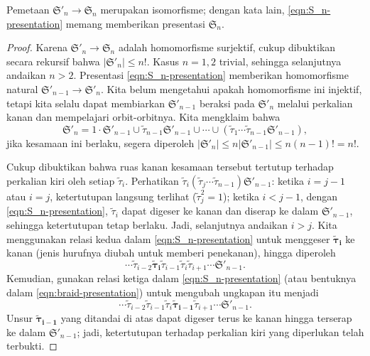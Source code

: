 \begin{theorem}\label{prop:S_n-presentation}
	Pemetaan $\mathfrak{S}'_n \to \mathfrak{S}_n$ merupakan isomorfisme; dengan kata lain, \eqref{eqn:S_n-presentation} memang memberikan presentasi $\mathfrak{S}_n$.
\end{theorem}
\begin{proof}
	Karena $\mathfrak{S}'_n \to \mathfrak{S}_n$ adalah homomorfisme surjektif, cukup dibuktikan secara rekursif bahwa $|\mathfrak{S}'_n| \leq n!$. Kasus $n=1,2$ trivial, sehingga selanjutnya andaikan $n > 2$. Presentasi \eqref{eqn:S_n-presentation} memberikan homomorfisme natural $\mathfrak{S}'_{n-1} \to \mathfrak{S}'_n$. Kita belum mengetahui apakah homomorfisme ini injektif, tetapi kita selalu dapat membiarkan $\mathfrak{S}'_{n-1}$ beraksi pada $\mathfrak{S}'_n$ melalui perkalian kanan dan mempelajari orbit-orbitnya. Kita mengklaim bahwa
	\[ \mathfrak{S}'_n = 1 \cdot \mathfrak{S}'_{n-1} \cup \tilde{\tau}_{n-1}\mathfrak{S}'_{n-1} \cup \cdots \cup (\tilde{\tau}_1 \cdots \tilde{\tau}_{n-1} \mathfrak{S}'_{n-1}), \]
	jika kesamaan ini berlaku, segera diperoleh $|\mathfrak{S}'_n| \leq n |\mathfrak{S}'_{n-1}| \leq n(n-1)! = n!$.
	
	Cukup dibuktikan bahwa ruas kanan kesamaan tersebut tertutup terhadap perkalian kiri oleh setiap $\tilde{\tau}_i$. Perhatikan $\tilde{\tau}_i (\tilde{\tau}_j \cdots \tilde{\tau}_{n-1}) \mathfrak{S}'_{n-1}$: ketika $i=j-1$ atau $i=j$, ketertutupan langsung terlihat ($\tilde{\tau}_j^2 = 1$); ketika $i < j-1$, dengan \eqref{eqn:S_n-presentation}, $\tilde{\tau}_i$ dapat digeser ke kanan dan diserap ke dalam $\mathfrak{S}'_{n-1}$, sehingga ketertutupan tetap berlaku. Jadi, selanjutnya andaikan $i>j$. Kita menggunakan relasi kedua dalam \eqref{eqn:S_n-presentation} untuk menggeser $\bm{\tilde{\tau}_i}$ ke kanan (jenis hurufnya diubah untuk memberi penekanan), hingga diperoleh
	\[ \cdots \tilde{\tau}_{i-2} \bm{\tilde{\tau}_i} \tilde{\tau}_{i-1} \tilde{\tau}_i \tilde{\tau}_{i+1} \cdots \mathfrak{S}'_{n-1}. \]
	Kemudian, gunakan relasi ketiga dalam \eqref{eqn:S_n-presentation} (atau bentuknya dalam \eqref{eqn:braid-presentation}) untuk mengubah ungkapan itu menjadi
	\[ \cdots \tilde{\tau}_{i-2} \tilde{\tau}_{i-1} \tilde{\tau}_i \bm{\tilde{\tau}_{i-1}} \tilde{\tau}_{i+1} \cdots \mathfrak{S}'_{n-1}. \]
	Unsur $\bm{\tilde{\tau}_{i-1}}$ yang ditandai di atas dapat digeser terus ke kanan hingga terserap ke dalam $\mathfrak{S}'_{n-1}$; jadi, ketertutupan terhadap perkalian kiri yang diperlukan telah terbukti.
\end{proof}

